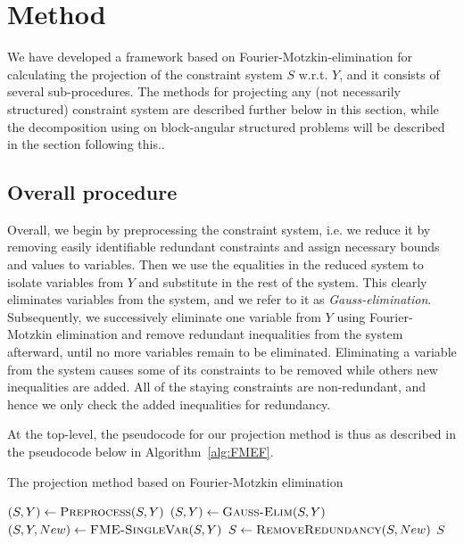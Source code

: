 %
%
\section{Method}
We have developed a framework based on Fourier-Motzkin-elimination for calculating the projection of the constraint system $S$ w.r.t. $Y$, and it %
consists of several sub-procedures. The methods for projecting any (not necessarily structured) constraint system are described further below in this section, while the decomposition using on block-angular structured problems will be described in the section following this..

\subsection{Overall procedure}
Overall, we begin by preprocessing the constraint system, i.e. we reduce it by removing easily identifiable redundant constraints and assign necessary bounds and values to variables.
Then we use the equalities in the reduced system to isolate variables from $Y$ and substitute in the rest of the system. This clearly eliminates variables from the system, and we refer to it as \emph{Gauss-elimination}.  
Subsequently, we successively eliminate one variable from $Y$ using Fourier-Motzkin elimination and remove redundant inequalities from the system afterward, until no more variables remain to be eliminated. Eliminating a variable from the system causes some of its constraints to be removed while others new inequalities are added. All of the {staying} constraints are non-redundant, and hence we only check the added inequalities for redundancy. 

At the top-level, the pseudocode for our projection method is thus as described in the pseudocode below in Algorithm~\ref{alg:FMEF}. 

\begin{algorithm}
\caption{The projection method based on Fourier-Motzkin elimination} 
\label{alg:FMEF}
\begin{algorithmic}
	\State $(S,Y)\gets \Call{Preprocess}{S,Y}$
	\State $(S,Y)\gets\Call{Gauss-Elim}{S,Y}$
		\State $(S, Y, New )\gets\Call{FME-SingleVar}{S,Y}$
		\State $S\gets\Call{RemoveRedundancy}{S,New}$
	\EndWhile
	\State \Return $S$
\EndFunction
\end{algorithmic}
\end{algorithm}

